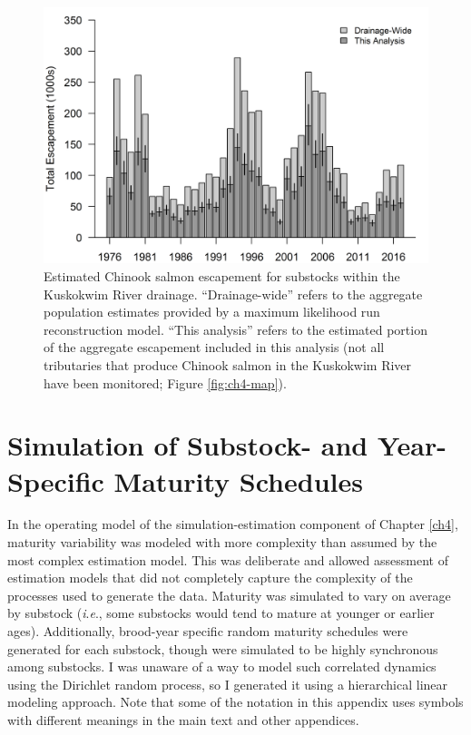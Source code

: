 \documentclass[12pt,]{book}
\theoremstyle{definition}
\theoremstyle{definition}
\theoremstyle{definition}
\theoremstyle{remark}
\begin{document}
\begin{figure}
  \centering
  \includegraphics{img/Ch4/obs-fraction.png}
  \caption{Estimated Chinook salmon escapement for substocks within the Kuskokwim River drainage. ``Drainage-wide'' refers to the aggregate population estimates provided by a maximum likelihood run reconstruction model. ``This analysis'' refers to the estimated portion of the aggregate escapement included in this analysis (not all tributaries that produce Chinook salmon in the Kuskokwim River have been monitored; Figure \ref{fig:ch4-map}).}
  \label{fig:obs-fraction}
\end{figure}

\doublespacing

\chapter{Simulation of Substock- and Year-Specific Maturity
Schedules}\label{appendix-e}

\noindent
In the operating model of the simulation-estimation component of Chapter
\ref{ch4}, maturity variability was modeled with more complexity than
assumed by the most complex estimation model. This was deliberate and
allowed assessment of estimation models that did not completely capture
the complexity of the processes used to generate the data. Maturity was
simulated to vary on average by substock (\emph{i}.\emph{e}., some
substocks would tend to mature at younger or earlier ages).
Additionally, brood-year specific random maturity schedules were
generated for each substock, though were simulated to be highly
synchronous among substocks. I was unaware of a way to model such
correlated dynamics using the Dirichlet random process, so I generated
it using a hierarchical linear modeling approach. Note that some of the
notation in this appendix uses symbols with different meanings in the
main text and other appendices.
\end{document}
